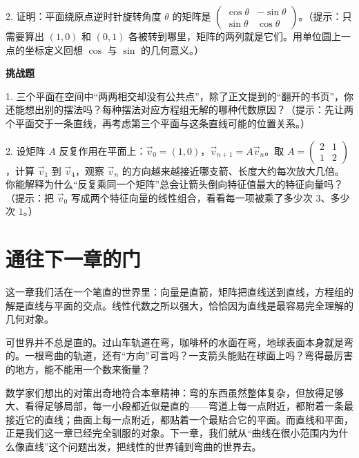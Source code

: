 2. 证明：平面绕原点逆时针旋转角度 $\theta$ 的矩阵是 $\begin{pmatrix}\cos\theta&-\sin\theta\\ \sin\theta&\cos\theta\end{pmatrix}$。（提示：只需要算出 $(1,0)$ 和 $(0,1)$ 各被转到哪里，矩阵的两列就是它们。用单位圆上一点的坐标定义回想 $\cos$ 与 $\sin$ 的几何意义。）

\textbf{挑战题}

1. 三个平面在空间中“两两相交却没有公共点”，除了正文提到的“翻开的书页”，你还能想出别的摆法吗？每种摆法对应方程组无解的哪种代数原因？（提示：先让两个平面交于一条直线，再考虑第三个平面与这条直线可能的位置关系。）

2. 设矩阵 $A$ 反复作用在平面上：$\vec{v}_0=(1,0)$，$\vec{v}_{n+1}=A\vec{v}_n$。取 $A=\begin{pmatrix}2&1\\1&2\end{pmatrix}$，计算 $\vec{v}_1$ 到 $\vec{v}_4$，观察 $\vec{v}_n$ 的方向越来越接近哪支箭、长度大约每次放大几倍。你能解释为什么“反复乘同一个矩阵”总会让箭头倒向特征值最大的特征向量吗？（提示：把 $\vec{v}_0$ 写成两个特征向量的线性组合，看看每一项被乘了多少次 $3$、多少次 $1$。）

\section*{通往下一章的门}

这一章我们活在一个笔直的世界里：向量是直箭，矩阵把直线送到直线，方程组的解是直线与平面的交点。线性代数之所以强大，恰恰因为直线是最容易完全理解的几何对象。

可世界并不总是直的。过山车轨道在弯，咖啡杯的水面在弯，地球表面本身就是弯的。一根弯曲的轨道，还有“方向”可言吗？一支箭头能贴在球面上吗？弯得最厉害的地方，能不能用一个数来衡量？

数学家们想出的对策出奇地符合本章精神：弯的东西虽然整体复杂，但放得足够大、看得足够局部，每一小段都近似是直的——弯道上每一点附近，都附着一条最接近它的直线；曲面上每一点附近，都贴着一个最贴合它的平面。而直线和平面，正是我们这一章已经完全驯服的对象。下一章，我们就从“曲线在很小范围内为什么像直线”这个问题出发，把线性的世界铺到弯曲的世界去。
